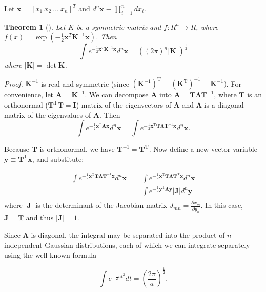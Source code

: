 \documentclass[12pt]{article}
\newcommand{\mv}[1]{\mathbf{#1}}	%
\newcommand{\mvt}[1]{\mv{#1}^{\mathrm{T}}}
\newcommand{\mvi}[1]{\mv{#1}^{-1}}
\begin{document}
Let $\mv{x} = [x_1\ x_2\ \ldots\ x_n]^T$ and $d^n \mv{x} \equiv \prod_{i=1}^{n} d x_i$.
\newtheorem{thm}{Theorem}
\begin{thm}[]
Let  $K$ be a  symmetric  matrix and
 $f: R^n \to R$, where
$f(x) = \exp{(- \frac{1}{2} \mv{x}^T \mv{K}^{-1} \mv{x})}$.
Then  
\begin{equation}
\int e^{-\frac{1}{2} \mv{x}^T \mv{K}^{-1} \mv{x}} d^n \mv{x} = \left((2\pi)^n |\mv{K}| \right)^{\frac{1}{2}}
\end{equation}
where $|\mv{K}| = \det{\mv{K}}$.
\end{thm}
\emph{Proof.} $\mvi{K}$ is real and symmetric (since $(\mvi{K})^{\mathrm{T}} = (\mvt{K})^{-1} = \mv{K}^{-1})$.  For convenience, let $\mv{A} = \mvi{K}$.  We can decompose $\mv{A}$ into $\mv{A} = \mv{T} \mv{\Lambda} \mvi{T}$, where $\mv{T}$ is an orthonormal ($\mvt{T} \mv{T} = \mv{I}$) matrix of the eigenvectors of $\mv{A}$ and $\mv{\Lambda}$ is a diagonal matrix of the eigenvalues of $\mv{A}$.  Then
\begin{equation}
\int e^{-\frac{1}{2} \mvt{x} \mv{A} \mv{x}} d^n \mv{x} = \int e^{-\frac{1}{2} \mvt{x} \mv{T} \mv{\Lambda} \mvi{T} \mv{x}} d^n \mv{x}.
\end{equation}

Because $\mv{T}$ is orthonormal, we have $\mvi{T} = \mvt{T}$.  Now define a new vector variable $\mv{y} \equiv \mvt{T} \mv{x}$, and substitute:

\begin{align}
\int e^{-\frac{1}{2} \mvt{x} \mv{T} \mv{\Lambda} \mvi{T} \mv{x}} d^n \mv{x}
&= \int e^{-\frac{1}{2} \mvt{x} \mv{T} \mv{\Lambda} \mvt{T} \mv{x}} d^n \mv{x}\\
&= \int e^{-\frac{1}{2} \mvt{y} \mv{\Lambda}\mv{y}} |\mv{J}| d^n \mv{y}\\
\end{align}
where $|\mv{J}|$ is the determinant of the Jacobian matrix $J_{mn} = \frac{\partial{x_m}}{\partial{y_n}}$.  In this case, $\mv{J} = \mv{T}$ and thus $|\mv{J}| = 1$.

Since  $\mv{\Lambda}$ is diagonal,  the integral may be separated into the product of $n$ independent Gaussian distributions, each of which we can integrate separately using the well-known formula

\begin{equation}
\int e^{-\frac{1}{2} a t^2} dt = \left(\frac{2 \pi}{a}\right)^{\frac{1}{2}}.
\end{equation}
\end{document}
